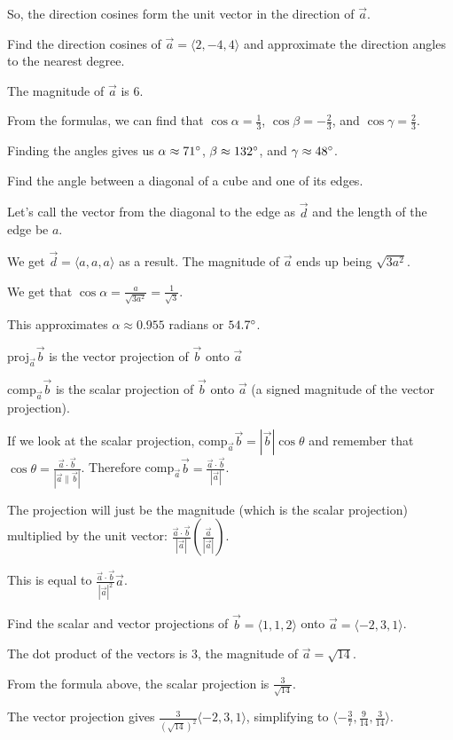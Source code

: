 \documentclass[../calc3.tex]{subfiles}
\begin{document}
So, the direction cosines form the unit vector in the direction of $\vec{a}$.

\begin{example}
    Find the direction cosines of $\vec{a}=\langle 2,-4,4\rangle$ and approximate the direction angles to the nearest degree.

    The magnitude of $\vec{a}$ is $6$.

    From the formulas, we can find that $\cos\alpha = \frac{1}{3}$, $\cos\beta = -\frac{2}{3}$, and $\cos\gamma = \frac{2}{3}$.

    Finding the angles gives us $\alpha \approx 71\degree$, $\beta \approx 132\degree$, and $\gamma \approx 48\degree$.
\end{example}

\begin{example}
    Find the angle between a diagonal of a cube and one of its edges.

    Let's call the vector from the diagonal to the edge as $\vec{d}$ and the length of the edge be $a$.

    We get $\vec{d}=\langle a,a,a\rangle$ as a result. The magnitude of $\vec{a}$ ends up being $\sqrt{3a^2}$.

    We get that $\cos\alpha = \frac{a}{\sqrt{3a^2}}=\frac{1}{\sqrt{3}}$.

    This approximates $\alpha \approx 0.955$ radians or $54.7\degree$.
\end{example}

proj$_{\vec{a}}\vec{b}$ is the vector projection of $\vec{b}$ onto $\vec{a}$

comp$_{\vec{a}}\vec{b}$ is the scalar projection of $\vec{b}$ onto $\vec{a}$ (a signed magnitude of the vector projection).

If we look at the scalar projection, comp$_{\vec{a}}\vec{b}=|\vec{b}|\cos\theta$ and remember that $\cos\theta = \frac{\vec{a}\cdot\vec{b}}{|\vec{a}\|\vec{b}|}$.
Therefore comp$_{\vec{a}}\vec{b}=\frac{\vec{a}\cdot \vec{b}}{|\vec{a}|}$.

The projection will just be the magnitude (which is the scalar projection) multiplied by the unit vector: $\frac{\vec{a}\cdot \vec{b}}{|\vec{a}|}\left(\frac{\vec{a}}{|\vec{a}|}\right)$.

This is equal to $\frac{\vec{a}\cdot \vec{b}}{|\vec{a}|^2}\vec{a}$.

\begin{example}
    Find the scalar and vector projections of $\vec{b}=\langle 1,1,2\rangle$ onto $\vec{a} = \langle -2,3,1\rangle$.

    The dot product of the vectors is $3$, the magnitude of $\vec{a}=\sqrt{14}$.

    From the formula above, the scalar projection is $\frac{3}{\sqrt{14}}$.

    The vector projection gives $\frac{3}{(\sqrt{14})^2}\langle -2,3,1\rangle$, simplifying to $\langle -\frac{3}{7},\frac{9}{14},\frac{3}{14} \rangle$.
\end{example}
\end{document}
